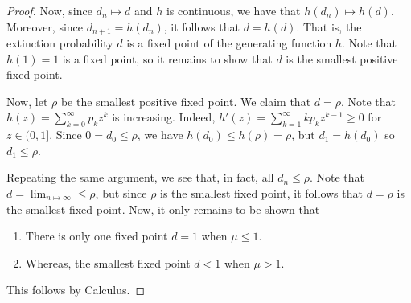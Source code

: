 \documentclass[letterpaper]{article}
\begin{document}
\begin{mdframed}[]
\begin{proof}
        Now, since $d_n \mapsto d$ and $h$ is continuous, we have that $h(d_n) \mapsto h(d)$. Moreover, since $d_{n + 1} = h(d_n)$, it follows that $d = h(d)$. That is, the extinction probability $d$ is a fixed point of the generating function $h$. Note that $h(1) = 1$ is a fixed point, so it remains to show that $d$ is the smallest positive fixed point.

        \bigskip 

        Now, let $\rho$ be the smallest positive fixed point. We claim that $d = \rho$. Note that $h(z) = \sum_{k = 0}^{\infty} p_k z^k$ is increasing. Indeed, $h'(z) = \sum_{k = 1}^{\infty} kp_k z^{k - 1} \geq 0$ for $z \in (0, 1]$. Since $0 = d_0 \leq \rho$, we have $h(d_0) \leq h(\rho) = \rho$, but $d_1 = h(d_0)$ so $d_1 \leq \rho$.

        \bigskip 

        Repeating the same argument, we see that, in fact, all $d_n \leq \rho$. Note that $d = \lim_{n \mapsto \infty} \leq \rho$, but since $\rho$ is the smallest fixed point, it follows that $d = \rho$ is the smallest fixed point. Now, it only remains to be shown that 
        \begin{enumerate}
            \item There is only one fixed point $d = 1$ when $\mu \leq 1$.
            \item Whereas, the smallest fixed point $d < 1$ when $\mu > 1$. 
        \end{enumerate}
        This follows by Calculus.
    \end{proof}
\end{mdframed}
\end{document}
